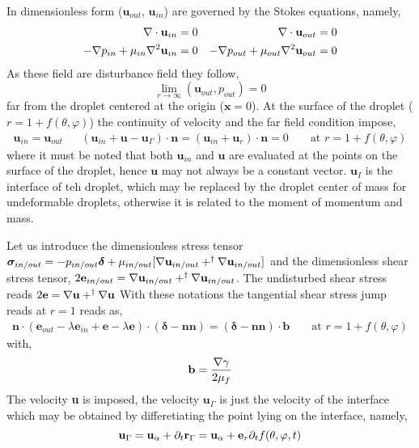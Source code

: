 In dimensionless form ($\textbf{u}_{out}$, $\textbf{u}_{in}$) are governed by the Stokes equations, namely, 
\begin{align}
    \mathbf{\nabla}\cdot \textbf{u}_{in} = 0 
    && \mathbf{\nabla}\cdot \textbf{u}_{out} = 0 \\
    -\mathbf{\nabla} p_{in} + \mu_{in}\mathbf{\nabla}^2 \textbf{u}_{in}  = 0 
    &&-\mathbf{\nabla} p_{out} + \mu_{out}\mathbf{\nabla}^2 \textbf{u}_{out}  = 0 
\end{align}
As these field are disturbance field they follow,
\begin{equation}
    \lim_{r\to \infty}(\textbf{u}_{out},p_{out}) = 0 
\end{equation}
far from the droplet centered at the origin ($\textbf{x} = 0$). 
At the surface of the droplet ($r = 1 + f(\theta,\varphi)$) the continuity of velocity and the far field condition impose, 
\begin{align}
    \textbf{u}_{in} = \textbf{u}_{out}
    && 
    (\textbf{u}_{in}  + \textbf{u} - \textbf{u}_\Gamma)\cdot \textbf{n}
    = (\textbf{u}_{in}  + \textbf{u}_r)\cdot \textbf{n}
    = 0
    &&
    \text{ at }
    r = 1 + f(\theta,\varphi)
\end{align}
where it must be noted that both $\textbf{u}_{in}$ and $\textbf{u}$ are evaluated at the points on the surface of the droplet, hence $\textbf{u}$ may not always be a constant vector. 
$\textbf{u}_I$ is the interface of teh droplet, which may be replaced by the droplet center of mass for undeformable droplets, otherwise it is related to the moment of momentum and mass. 


Let us introduce the dimensionless stress tensor $\bm\sigma_{in/out} = -p_{in/out} \bm\delta + \mu_{in/out}[\mathbf{\nabla} \textbf{u}_{in/out} + ^\dagger \mathbf{\nabla} \textbf{u}_{in/out}]$ and the dimensionless shear stress tensor, $2\textbf{e}_{in/out} = \mathbf{\nabla} \textbf{u}_{in/out} + ^\dagger \mathbf{\nabla} \textbf{u}_{in/out}$. 
The undisturbed shear stress reads  $2\textbf{e} = \mathbf{\nabla} \textbf{u} + ^\dagger \mathbf{\nabla} \textbf{u}$
With these notations the tangential shear stress jump reads at $r = 1$ reads as, 
\begin{align}
    \mathbf{n}\cdot (\textbf{e}_{out} - \lambda \textbf{e}_{in}+\textbf{e} -\lambda\textbf{e})\cdot (\bm\delta - \textbf{nn})
    = (\bm\delta - \textbf{nn})\cdot \textbf{b}
    &&
    \text{ at }
    r = 1 + f(\theta,\varphi)
\end{align}
with, 
\begin{equation}
    \textbf{b}
    =
    \frac{\mathbf{\nabla} \gamma}{2\mu_f}
\end{equation}
The velocity \textbf{u} is imposed, the velocity $\textbf{u}_\Gamma$ is just the velocity of the interface which may be obtained by differetiating the point lying on the interface, namely, 
\begin{equation}
    \textbf{u}_\Gamma
    =
    \textbf{u}_\alpha
    +
    \partial_t \textbf{r}_\Gamma
    =
    \textbf{u}_\alpha
    + 
    \textbf{e}_r\partial_t f(\theta,\varphi,t)
\end{equation}

